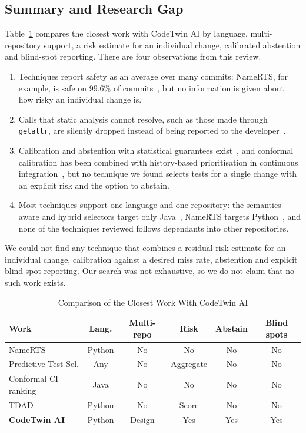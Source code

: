 \documentclass[conference]{IEEEtran}
\begin{document}
\subsection{Summary and Research Gap}\label{sec:gap}
Table~\ref{tab:gap} compares the closest work with CodeTwin AI by language, multi-repository support, a risk estimate for an individual change, calibrated abstention and blind-spot reporting. There are four observations from this review.
\begin{enumerate}
\item Techniques report safety as an average over many commits: NameRTS, for example, is safe on 99.6\% of commits~\cite{wang2026namerts}, but no information is given about how risky an individual change is.
\item Calls that static analysis cannot resolve, such as those made through \texttt{getattr}, are silently dropped instead of being reported to the developer~\cite{salis2021pycg}.
\item Calibration and abstention with statistical guarantees exist~\cite{angelopoulos2024crc,yadkori2024abstention}, and conformal calibration has been combined with history-based prioritisation in continuous integration~\cite{altinisik2026conformal}, but no technique we found selects tests for a single change with an explicit risk and the option to abstain.
\item Most techniques support one language and one repository: the semantics-aware and hybrid selectors target only Java~\cite{liu2023finerts,zhang2024jcgeks}, NameRTS targets Python~\cite{wang2026namerts}, and none of the techniques reviewed follows dependants into other repositories.
\end{enumerate}
We could not find any technique that combines a residual-risk estimate for an individual change, calibration against a desired miss rate, abstention and explicit blind-spot reporting. Our search was not exhaustive, so we do not claim that no such work exists.
\begin{table}[t]
\caption{Comparison of the Closest Work With CodeTwin AI}
\label{tab:gap}
\centering
\footnotesize
\setlength{\tabcolsep}{1.8pt}
\begin{tabular}{@{}lccccc@{}}
\toprule
\textbf{Work} & \textbf{Lang.} & \textbf{Multi-repo} & \textbf{Risk} & \textbf{Abstain} & \textbf{Blind spots} \\
\midrule
NameRTS & Python & No & No & No & No \\
Predictive Test Sel. & Any & No & Aggregate & No & No \\
Conformal CI ranking & Java & No & No & No & No \\
TDAD & Python & No & Score & No & No \\
\textbf{CodeTwin AI} & Python & Design & Yes & Yes & Yes \\
\bottomrule
\end{tabular}
\end{table}
\end{document}
